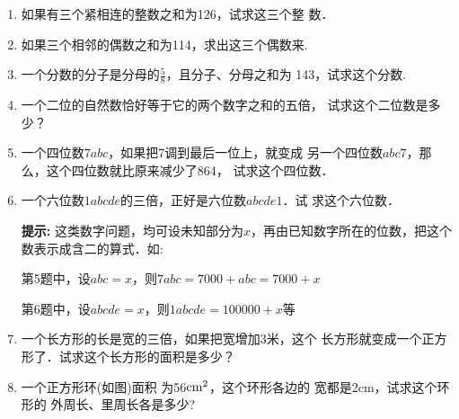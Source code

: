 \begin{enumerate}
    \item 如果有三个紧相连的整数之和为126，试求这三个整
    数．
    \item 如果三个相邻的偶数之和为114，求出这三个偶数来.
    \item 一个分数的分子是分母的$\frac{5}{8}$，且分子、分母之和为
    143，试求这个分数.
    \item 一个二位的自然数恰好等于它的两个数字之和的五倍，
    试求这个二位数是多少？
    \item 一个四位数$7abc$，如果把7调到最后一位上，就变成
    另一个四位数$abc7$，那么，这个四位数就比原来减少了864，
    试求这个四位数．
    \item 一个六位数$1abcde$的三倍，正好是六位数$abcde1$．试
    求这个六位数．
        
    \textbf{提示:} 这类数字问题，均可设未知部分为$x$，再由已知数字所在的位数，把这个数表示成含二的算式．如:

    第5题中，设$abc=x$，则$7abc=7000+abc = 7000+x$

    第6题中，设$abcde = x$，则$1abcde =100000 + x$等

 \item  一个长方形的长是宽的三倍，如果把宽增加3米，这个
 长方形就变成一个正方形了．试求这个长方形的面积是多少？
    
\item   一个正方形环(如图)面积
为56${\rm cm}^2$，这个环形各边的
宽都是2cm，试求这个环形的
外周长、里周长各是多少?

\begin{center}
\end{center}


\end{enumerate}
